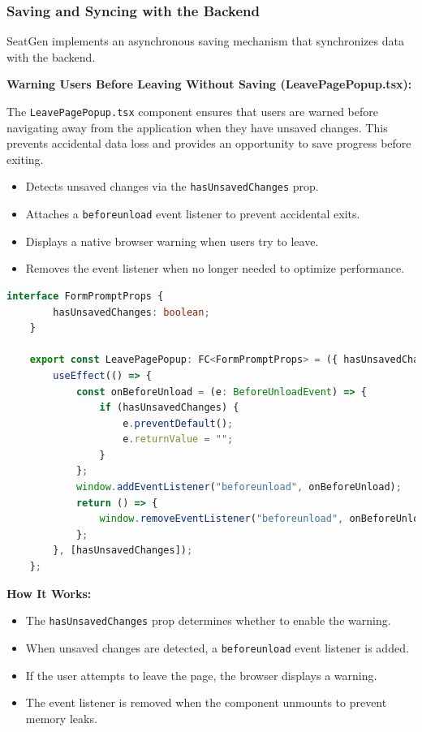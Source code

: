 \subsubsection{Saving and Syncing with the Backend}
SeatGen implements an asynchronous saving mechanism that synchronizes data with the backend.

\textbf{Warning Users Before Leaving Without Saving (LeavePagePopup.tsx):}

The \texttt{LeavePagePopup.tsx} component ensures that users are warned before navigating away from the application when they have unsaved changes. This prevents accidental data loss and provides an opportunity to save progress before exiting.

\begin{itemize}
    \item Detects unsaved changes via the \texttt{hasUnsavedChanges} prop.
    \item Attaches a \texttt{beforeunload} event listener to prevent accidental exits.
    \item Displays a native browser warning when users try to leave.
    \item Removes the event listener when no longer needed to optimize performance.
\end{itemize}

\begin{lstlisting}[language=TypeScript, caption=Auto-Saving on Unload, label=lst:auto-save-seats]
    interface FormPromptProps {
        hasUnsavedChanges: boolean;
    }
    
    export const LeavePagePopup: FC<FormPromptProps> = ({ hasUnsavedChanges }) => {
        useEffect(() => {
            const onBeforeUnload = (e: BeforeUnloadEvent) => {
                if (hasUnsavedChanges) {
                    e.preventDefault();
                    e.returnValue = "";
                }
            };
            window.addEventListener("beforeunload", onBeforeUnload);
            return () => {
                window.removeEventListener("beforeunload", onBeforeUnload);
            };
        }, [hasUnsavedChanges]);
    };
\end{lstlisting}


\textbf{How It Works:}
\begin{itemize}
    \item The \texttt{hasUnsavedChanges} prop determines whether to enable the warning.
    \item When unsaved changes are detected, a \texttt{beforeunload} event listener is added.
    \item If the user attempts to leave the page, the browser displays a warning.
    \item The event listener is removed when the component unmounts to prevent memory leaks.
\end{itemize}

